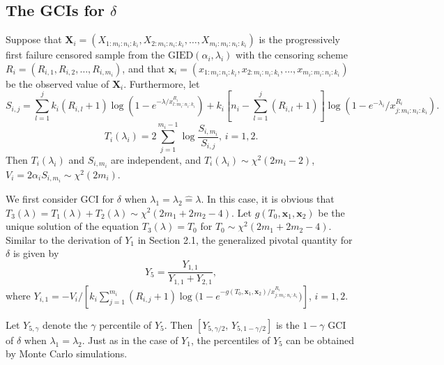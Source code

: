 \documentclass[12pt]{article}
\begin{document}
\subsection{The GCIs for $\delta$}
Suppose that $\textbf{X}_i=(X_{1:m_i:n_i:k_i}, X_{2:m_i:n_i:k_i},\ldots, X_{m_i:m_i:n_i:k_i})$ is the progressively first failure censored sample from the $\mbox{GIED}(\alpha_i,\lambda_i)$ with the censoring scheme $R_i=(R_{i,1},R_{i,2},\ldots,R_{i,m_i})$, and that $\textbf{x}_i=(x_{1:m_i:n_i:k_i},x_{2:m_i:n_i:k_i},\ldots,x_{m_i:m_i:n_i:k_i})$ be the observed value of $\textbf{X}_i$. %
Furthermore, let
$$S_{i,j}=\sum_{l=1}^j k_i(R_{i,l}+1)\log(1-e^{-\lambda/x_{l:m_i:n_i:k_i}^{R_i}})+k_i[n_i-\sum\limits_{l=1}^j (R_{i,l}+1)] \log(1-e^{-\lambda_i}/x_{j:m_i:n_i:k_i}^{R_i}).$$
$$T_i(\lambda_i)=2\sum_{j=1}^{m_i-1}\log\frac{S_{i,m_i}}{S_{i,j}},\,i=1,2.$$
Then $T_i(\lambda_i)$ and $S_{i,m_i}$ are independent, and $T_i(\lambda_i)\sim \chi^2(2m_i-2)$, $V_i=2\alpha_i S_{i,m_i}\sim \chi^2(2m_i)$.






We first consider GCI for $\delta$ when $\lambda_1=\lambda_2\hat{=}\lambda$. In this case, it is obvious that $T_3(\lambda)=T_1(\lambda)+T_2(\lambda)\sim \chi^2(2m_1+2m_2-4)$. Let $g(T_0, \textbf{x}_1,\textbf{x}_2)$ be the unique solution of the equation $T_3(\lambda)=T_0$ for $T_0\sim\chi^2(2m_1+2m_2-4)$.
Similar to the derivation of $Y_1$ in Section 2.1, the generalized pivotal quantity for $\delta$ is given by
\begin{equation}\label{eq27}
Y_5=\frac{Y_{1,1}}{Y_{1,1}+Y_{2,1}},
\end{equation}
where $Y_{i,1}=-V_i/[k_i\sum_{j=1}^{m_i}(R_{i,j}+1)\log({1-e^{{-g(T_0,\textbf{x}_1,\textbf{x}_2)}/{x_{j:m_i:n_i:k_i}^{R_i}}})}]$, $i=1,2$.

Let $Y_{5,\gamma}$ denote the $\gamma$ percentile of $Y_5$. Then $[Y_{5,\gamma/2},\, Y_{5,1-\gamma/2}]$  is the $1-\gamma$ GCI of $\delta$ when $\lambda_1=\lambda_2$. Just as in the case of $Y_1$, the percentiles of $Y_5$ can be obtained by Monte Carlo simulations.
\end{document}
